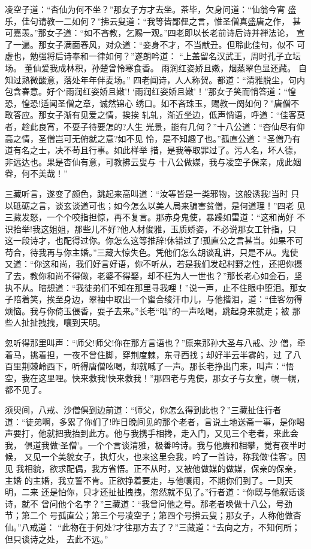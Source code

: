 凌空子道：“杏仙为何不坐？”那女子方才去坐。茶毕，欠身问道：“仙翁今宵
盛乐，佳句请教一二如何？”拂云叟道：“我等皆鄙俚之言，惟圣僧真盛唐之作，
甚可嘉羡。”那女子道：“如不吝教，乞赐一观。”四老即以长老前诗后诗并禅法论，
宣了一遍。那女子满面春风，对众道：“妾身不才，不当献丑。但聆此佳句，似不
可虚也，勉强将后诗奉和一律如何？”遂朗吟道：
“上盖留名汉武王，周时孔子立坛场。
董仙爱我成林积，孙楚曾怜寒食香。
雨润红姿娇且嫩，烟蒸翠色显还藏。
自知过熟微酸意，落处年年伴麦场。”
四老闻诗，人人称贺。都道：“清雅脱尘，句内包含春意。好个‘雨润红姿娇且嫩’!
‘雨润红姿娇且嫩’！”那女子笑而悄答道：“惶恐，惶恐!适闻圣僧之章，诚然锦心
绣口。如不吝珠玉，赐教一阕如何？”唐僧不敢答应。那女子渐有见爱之情，挨挨
轧轧，渐近坐边，低声悄语，呼道：“佳客莫者，趁此良宵，不耍子待要怎的?人生
光景，能有几何？”十八公道：“杏仙尽有仰高之情，圣僧岂可无俯就之意?如不见
怜，是不知趣了也。”孤直公道：“圣僧乃有道有名之士，决不苟且行事。如此样举
措，是我等取罪过了。污人名，坏人德，非远达也。果是杏仙有意，可教拂云叟与
十八公做媒，我与凌空子保亲，成此姻眷，何不美哉！”

三藏听言，遂变了颜色，跳起来高叫道：“汝等皆是一类邪物，这般诱我!当时
只以砥砺之言，谈玄谈道可也；如今怎么以美人局来骗害贫僧，是何道理！”四老
见三藏发怒，一个个咬指担惊，再不复言。那赤身鬼使，暴躁如雷道：“这和尚好
不识抬举!我这姐姐，那些儿不好?他人材俊雅，玉质娇姿，不必说那女工针指，只
这一段诗才，也配得过你。你怎么这等推辞!休错过了!孤直公之言甚当。如果不可
苟合，待我再与你主婚。”三藏大惊失色。凭他们怎么胡谈乱讲，只是不从。鬼使
又道：“你这和尚，我们好言好语，你不听从，若是我们发起村野之性，还把你摄
了去，教你和尚不得做，老婆不得娶，却不枉为人一世也？”那长老心如金石，坚
执不从。暗想道：“我徒弟们不知在那里寻我哩！”说一声，止不住眼中堕泪。那女
子陪着笑，挨至身边，翠袖中取出一个蜜合绫汗巾儿，与他揩泪，道：“佳客勿得
烦恼。我与你倚玉偎香，耍子去来。”长老“咄”的一声吆喝，跳起身来就走；被
那些人扯扯拽拽，嚷到天明。

忽听得那里叫声：“师父!师父!你在那方言语也？”原来那孙大圣与八戒、沙
僧，牵着马，挑着担，一夜不曾住脚，穿荆度棘，东寻西找；却好半云半雾的，过
了八百里荆棘岭西下，听得唐僧吆喝，却就喊了一声。那长老挣出门来，叫声：“悟
空，我在这里哩。快来救我!快来救我！”那四老与鬼使，那女子与女童，幌一幌，
都不见了。

须臾间，八戒、沙僧俱到边前道：“师父，你怎么得到此也？”三藏扯住行者
道：“徒弟啊，多累了你们了!昨日晚间见的那个老者，言说土地送斋一事，是你喝
声要打，他就把我抬到此方。他与我携手相搀，走入门，又见三个老者，来此会我，
俱道我做‘圣僧’。一个个言谈清雅，极善吟诗。我与他赓和相攀，觉有夜半时候，
又见一个美貌女子，执灯火，也来这里会我，吟了一首诗，称我做‘佳客’。因见
我相貌，欲求配偶，我方省悟。正不从时，又被他做媒的做媒，保亲的保亲，主婚
的主婚，我立誓不肯。正欲挣着要走，与他嚷闹，不期你们到了。一则天明，二来
还是怕你，只才还扯扯拽拽，忽然就不见了。”行者道：“你既与他叙话谈诗，就不
曾问他个名字？”三藏道：“我曾问他之号。那老者唤做十八公，号劲节；第二个
号孤直公；第三个号凌空子；第四个号拂云叟；那女子，人称他做杏仙。”八戒道：
“此物在于何处?才往那方去了？”三藏道：“去向之方，不知何所；但只谈诗之处，
去此不远。”

